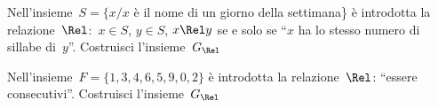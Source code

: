 \begin{esercizio}
\label{ese:B.5}
Nell'insieme~\(S = \{ x / x\) è il nome di un giorno della settimana\} è 
introdotta la relazione~\(\Rel\):~\(x \in S\), \(y \in S\), \(x \Rel y\) se e solo 
se ``\(x\) ha lo stesso numero di sillabe di~\(y\)''. Costruisci l'insieme~\(G_\Rel\)
\end{esercizio}

\begin{esercizio}
\label{ese:B.6}
Nell'insieme~\(F = \{ 1, 3, 4, 6, 5, 9, 0, 2 \}\) è introdotta la 
relazione~\(\Rel\): ``essere consecutivi''. Costruisci l'insieme~\(G_\Rel\)
\end{esercizio}

%  
%  


